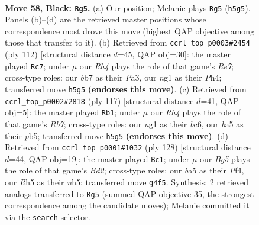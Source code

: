 \documentclass[11pt]{article}
\begin{document}
\clearpage

\begin{figure}[p]\centering
\begin{subfigure}{0.46\textwidth}\centering
\resizebox{\linewidth}{!}{%
\newchessgame
\chessboard[
  setfen={8/1B1k4/8/B6r/PK4bp/1P3p2/5R2/6N1 b - - 11 58},
  showmover=false,
  pgfstyle=straightmove, color=movearrow, markmove={h5-g5}
]}
\caption{}
\end{subfigure}\hfill
\begin{subfigure}{0.46\textwidth}\centering
\resizebox{\linewidth}{!}{%
\newchessgame
\chessboard[
  setfen={8/4R1p1/b2B1pk1/7p/7P/P4PP1/6r1/4K3 w - - 25 57},
  showmover=false,
  pgfstyle=straightmove, color=movearrow, markmove={e7-c7}
]}
\caption{}
\end{subfigure}
\\[4pt]
\begin{subfigure}{0.46\textwidth}\centering
\resizebox{\linewidth}{!}{%
\newchessgame
\chessboard[
  setfen={8/7R/2Bk4/1P6/2K2b2/2P5/1r5p/8 b - - 6 59},
  showmover=false,
  pgfstyle=straightmove, color=movearrow, markmove={b2-b1}
]}
\caption{}
\end{subfigure}\hfill
\begin{subfigure}{0.46\textwidth}\centering
\resizebox{\linewidth}{!}{%
\newchessgame
\chessboard[
  setfen={8/8/2R1bp2/5k1n/5Pp1/8/3B1K1P/8 w - - 26 65},
  showmover=false,
  pgfstyle=straightmove, color=movearrow, markmove={d2-c1}
]}
\caption{}
\end{subfigure}
\caption{\textbf{Move 58, Black: \texttt{Rg5}.} (a) Our position; Melanie plays \texttt{Rg5} (\texttt{h5g5}). Panels (b)--(d) are the retrieved master positions whose correspondence most drove this move (highest QAP objective among those that transfer to it). (b) Retrieved from \texttt{ccrl\_top\_p0003\#2454} (ply 112) [structural distance $d$=45, QAP obj=30]: the master played \texttt{Rc7}; under $\mu$ our \emph{Rh4} plays the role of that game's \emph{Re7}; cross-type roles: our \emph{b}b7 as their \emph{P}a3, our \emph{n}g1 as their \emph{P}h4; transferred move \texttt{h5g5} \textbf{(endorses this move)}. (c) Retrieved from \texttt{ccrl\_top\_p0002\#2818} (ply 117) [structural distance $d$=41, QAP obj=5]: the master played \texttt{Rb1}; under $\mu$ our \emph{Rh4} plays the role of that game's \emph{Rb7}; cross-type roles: our \emph{n}g1 as their \emph{b}c6, our \emph{b}a5 as their \emph{p}b5; transferred move \texttt{h5g5} \textbf{(endorses this move)}. (d) Retrieved from \texttt{ccrl\_top\_p0001\#1032} (ply 128) [structural distance $d$=44, QAP obj=19]: the master played \texttt{Bc1}; under $\mu$ our \emph{Bg5} plays the role of that game's \emph{Bd2}; cross-type roles: our \emph{b}a5 as their \emph{P}f4, our \emph{R}h5 as their \emph{n}h5; transferred move \texttt{g4f5}. Synthesis: 2 retrieved analogs transferred to \texttt{Rg5} (summed QAP objective 35, the strongest correspondence among the candidate moves); Melanie committed it via the \texttt{search} selector.}
\label{fig:thought-m115}
\end{figure}
\end{document}
